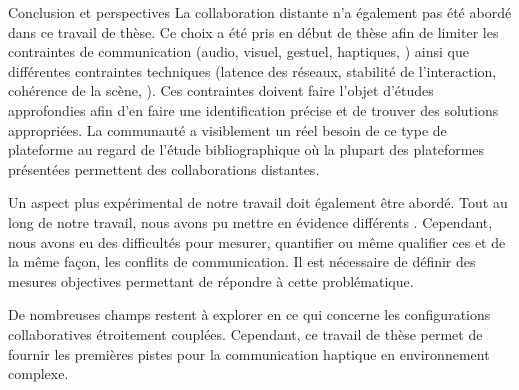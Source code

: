 \documentclass[myfrancais,ngerman,english,french]{mythesis}
\begin{document}
\begin{mychapter+}{Conclusion et perspectives}
		La collaboration distante n'a également pas été abordé dans ce travail de thèse.
		Ce choix a été pris en début de thèse afin de limiter les contraintes de communication (audio, visuel, gestuel, haptiques, \myetc) ainsi que différentes contraintes techniques (latence des réseaux, stabilité de l'interaction, cohérence de la scène, \myetc).
		Ces contraintes doivent faire l'objet d'études approfondies afin d'en faire une identification précise et de trouver des solutions appropriées.
		La communauté a visiblement un réel besoin de ce type de plateforme au regard de l'étude bibliographique  où la plupart des plateformes présentées permettent des collaborations distantes.

		Un aspect plus expérimental de notre travail doit également être abordé.
		Tout au long de notre travail, nous avons pu mettre en évidence différents .
		Cependant, nous avons eu des difficultés pour mesurer, quantifier ou même qualifier ces  et de la même façon, les conflits de communication.
		Il est nécessaire de définir des mesures objectives permettant de répondre à cette problématique.

		De nombreuses champs restent à explorer en ce qui concerne les configurations collaboratives étroitement couplées.
		Cependant, ce travail de thèse permet de fournir les premières pistes pour la communication haptique en environnement complexe.
	\end{mychapter+}
	\mybiblio%
	\myglossary
	\myappendix
\end{document}
